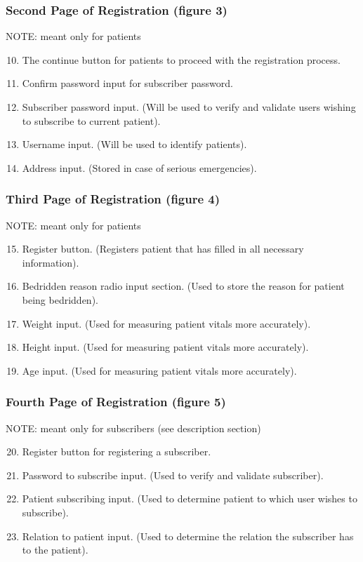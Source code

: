 \documentclass{article}
\begin{document}
\subsubsection{Second Page of Registration (figure 3)}
NOTE: meant only for patients
\begin{enumerate}
\setcounter{enumi}{9}
	\item The continue button for patients to proceed with the registration process. 
	\item Confirm password input for subscriber password. 
	\item Subscriber password input. (Will be used to verify and validate users wishing to subscribe to current patient). 
	\item Username input. (Will be used to identify patients). 
	\item Address input. (Stored in case of serious emergencies). 
\end{enumerate}
\subsubsection{Third Page of Registration (figure 4)}
NOTE: meant only for patients
\begin{enumerate}
\setcounter{enumi}{14}
	\item Register button. (Registers patient that has filled in all necessary information). 
	\item Bedridden reason radio input section. (Used to store the reason for patient being bedridden). 
	\item Weight input. (Used for measuring patient vitals more accurately). 
	\item Height input. (Used for measuring patient vitals more accurately). 
	\item Age input. (Used for measuring patient vitals more accurately). 
\end{enumerate}
\subsubsection{Fourth Page of Registration (figure 5)}
NOTE: meant only for subscribers (see description section)
\begin{enumerate}
\setcounter{enumi}{19}
	\item Register button for registering a subscriber. 
	\item Password to subscribe input. (Used to verify and validate subscriber). 
	\item Patient subscribing input. (Used to determine patient to which user wishes to subscribe). 
	\item Relation to patient input. (Used to determine the relation the subscriber has to the patient). 
\end{enumerate}
\end{document}
